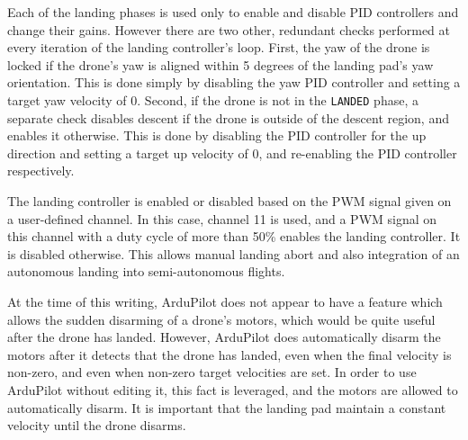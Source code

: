 Each of the landing phases is used only to enable and disable PID controllers and change their gains. However there are two other, redundant checks performed at every iteration of the landing controller's loop. First, the yaw of the drone is locked if the drone's yaw is aligned within 5 degrees of the landing pad's yaw orientation. This is done simply by disabling the yaw PID controller and setting a target yaw velocity of 0. Second, if the drone is not in the \texttt{LANDED} phase, a separate check disables descent if the drone is outside of the descent region, and enables it otherwise. This is done by disabling the PID controller for the up direction and setting a target up velocity of 0, and re-enabling the PID controller respectively.

The landing controller is enabled or disabled based on the PWM signal given on a user-defined channel. In this case, channel 11 is used, and a PWM signal on this channel with a duty cycle of more than 50\% enables the landing controller. It is disabled otherwise. This allows manual landing abort and also integration of an autonomous landing into semi-autonomous flights.

At the time of this writing, ArduPilot does not appear to have a feature which allows the sudden disarming of a drone's motors, which would be quite useful after the drone has landed. However, ArduPilot does automatically disarm the motors after it detects that the drone has landed, even when the final velocity is non-zero, and even when non-zero target velocities are set. In order to use ArduPilot without editing it, this fact is leveraged, and the motors are allowed to automatically disarm. It is important that the landing pad maintain a constant velocity until the drone disarms.




